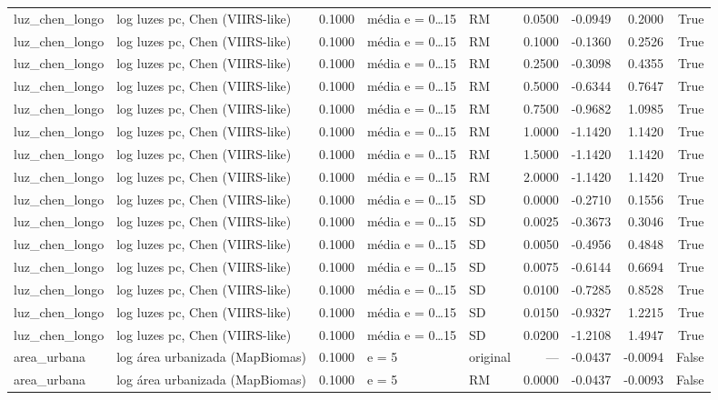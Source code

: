 \begin{table}
{\begin{tabular}{llrllrrrr}
luz\_chen\_longo & log luzes pc, Chen (VIIRS-like) & 0.1000 & média e = 0…15 & RM & 0.0500 & -0.0949 & 0.2000 & True \\
luz\_chen\_longo & log luzes pc, Chen (VIIRS-like) & 0.1000 & média e = 0…15 & RM & 0.1000 & -0.1360 & 0.2526 & True \\
luz\_chen\_longo & log luzes pc, Chen (VIIRS-like) & 0.1000 & média e = 0…15 & RM & 0.2500 & -0.3098 & 0.4355 & True \\
luz\_chen\_longo & log luzes pc, Chen (VIIRS-like) & 0.1000 & média e = 0…15 & RM & 0.5000 & -0.6344 & 0.7647 & True \\
luz\_chen\_longo & log luzes pc, Chen (VIIRS-like) & 0.1000 & média e = 0…15 & RM & 0.7500 & -0.9682 & 1.0985 & True \\
luz\_chen\_longo & log luzes pc, Chen (VIIRS-like) & 0.1000 & média e = 0…15 & RM & 1.0000 & -1.1420 & 1.1420 & True \\
luz\_chen\_longo & log luzes pc, Chen (VIIRS-like) & 0.1000 & média e = 0…15 & RM & 1.5000 & -1.1420 & 1.1420 & True \\
luz\_chen\_longo & log luzes pc, Chen (VIIRS-like) & 0.1000 & média e = 0…15 & RM & 2.0000 & -1.1420 & 1.1420 & True \\
luz\_chen\_longo & log luzes pc, Chen (VIIRS-like) & 0.1000 & média e = 0…15 & SD & 0.0000 & -0.2710 & 0.1556 & True \\
luz\_chen\_longo & log luzes pc, Chen (VIIRS-like) & 0.1000 & média e = 0…15 & SD & 0.0025 & -0.3673 & 0.3046 & True \\
luz\_chen\_longo & log luzes pc, Chen (VIIRS-like) & 0.1000 & média e = 0…15 & SD & 0.0050 & -0.4956 & 0.4848 & True \\
luz\_chen\_longo & log luzes pc, Chen (VIIRS-like) & 0.1000 & média e = 0…15 & SD & 0.0075 & -0.6144 & 0.6694 & True \\
luz\_chen\_longo & log luzes pc, Chen (VIIRS-like) & 0.1000 & média e = 0…15 & SD & 0.0100 & -0.7285 & 0.8528 & True \\
luz\_chen\_longo & log luzes pc, Chen (VIIRS-like) & 0.1000 & média e = 0…15 & SD & 0.0150 & -0.9327 & 1.2215 & True \\
luz\_chen\_longo & log luzes pc, Chen (VIIRS-like) & 0.1000 & média e = 0…15 & SD & 0.0200 & -1.2108 & 1.4947 & True \\
area\_urbana & log área urbanizada (MapBiomas) & 0.1000 & e = 5 & original & — & -0.0437 & -0.0094 & False \\
area\_urbana & log área urbanizada (MapBiomas) & 0.1000 & e = 5 & RM & 0.0000 & -0.0437 & -0.0093 & False \\

\end{tabular}}
\end{table}

